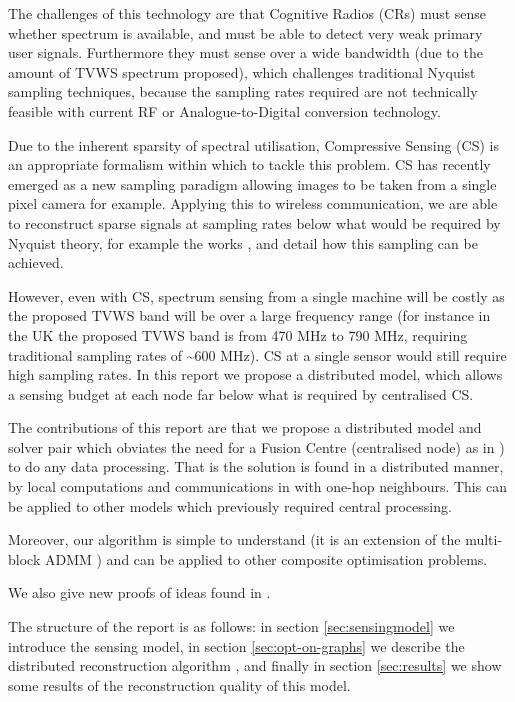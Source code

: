 \documentclass{article}
\begin{document}
The challenges of this technology are that Cognitive Radios (CRs) must sense whether spectrum is available, and must be able to detect very weak primary user signals. Furthermore they must sense over a wide bandwidth (due to the amount of TVWS spectrum proposed), which challenges traditional Nyquist sampling techniques, because the sampling rates required are not technically feasible with current RF or Analogue-to-Digital conversion technology.

Due to the inherent sparsity of spectral utilisation, Compressive Sensing (CS) \cite{Candes2006} is an appropriate formalism within which to tackle this problem. CS has recently emerged as a new sampling paradigm allowing images to be taken from a single pixel camera for example. Applying this to wireless communication, we are able to reconstruct sparse signals at sampling rates below what would be required by Nyquist theory, for example the works \cite{mishali2010theory}, and \cite{tropp2010beyond} detail how this sampling can be achieved. 

However, even with CS, spectrum sensing from a single machine will be costly as the proposed TVWS band will be over a large frequency range (for instance in the UK the proposed TVWS band is from 470 MHz to 790 MHz, requiring traditional sampling rates of \textasciitilde 600 MHz). CS at a single sensor would still require high sampling rates. In this report we propose a distributed model, which allows a sensing budget at each node far below what is required by centralised CS.

The contributions of this report are that we propose a distributed model and solver pair which obviates the need for a Fusion Centre (centralised node) as in \cite{Zhang2011b}) to do any data processing. That is the solution is found in a distributed manner, by local computations and communications in with one-hop neighbours. This can be applied to other models which previously required central processing.

Moreover, our algorithm is simple to understand (it is an extension of the multi-block ADMM \cite{mota2013d}) and can be applied to other composite optimisation problems.

We also give new proofs of ideas found in \cite{mota2013d}. 

The structure of the report is as follows: in section \ref{sec:sensingmodel} we introduce the sensing model, in section \ref{sec:opt-on-graphs} we describe the distributed reconstruction algorithm \cite{mota2013d}, and finally in section \ref{sec:results} we show some results of the reconstruction quality of this model. 
\end{document}
